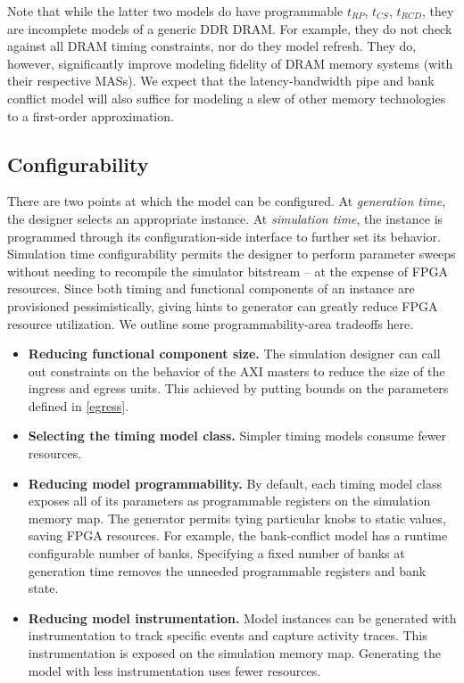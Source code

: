 Note that while the latter two models do have programmable $t_{RP}$, $t_{CS}$,
$t_{RCD}$, they are incomplete models of a generic DDR DRAM. For example, they
do not check against all DRAM timing constraints, nor do they model refresh.
They do, however, significantly improve modeling fidelity of DRAM memory systems
(with their respective MASs). We
expect that the latency-bandwidth pipe and bank conflict model will also
suffice for modeling a slew of other memory technologies to a first-order approximation.

\subsection{Configurability}

There are two points at which the model can be configured.  At
\textit{generation time}, the designer selects an appropriate instance. At
\textit{simulation time}, the instance is programmed through its
configuration-side interface to further set its behavior. Simulation time
configurability permits the designer to perform parameter sweeps without
needing to recompile the simulator bitstream -- at the expense of FPGA
resources. Since both timing and functional components of an instance are
provisioned pessimistically, giving hints to generator can greatly reduce FPGA
resource utilization. We outline some programmability-area tradeoffs here.

\begin{itemize}
    \item \textbf{Reducing functional component size.} The simulation designer can call
out constraints on the behavior of the AXI masters to reduce the size of the
ingress and egress units. This achieved by putting bounds on the parameters
defined in \ref{egress}.

	\item \textbf{Selecting the timing model class.} Simpler timing models consume fewer resources.

	\item \textbf{Reducing model programmability.} By default, each timing model class
exposes all of its parameters as programmable registers on the simulation
memory map. The generator permits tying particular knobs to static values,
saving FPGA resources. For example, the bank-conflict model has a runtime
configurable number of banks. Specifying a fixed number of banks at generation
time removes the unneeded programmable registers and bank state.

	\item \textbf{Reducing model instrumentation.} Model instances can be generated with
instrumentation to track specific events and capture activity traces. This
instrumentation is exposed on the simulation memory map. Generating the model
with less instrumentation uses fewer resources.
\end{itemize}
